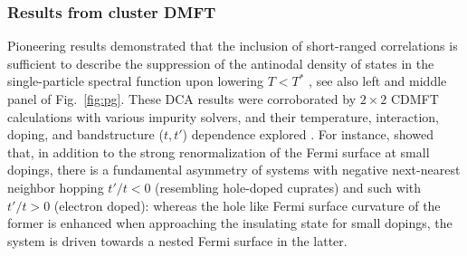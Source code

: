 \documentclass{ar-1col}
\begin{document}
\subsubsection{Results from cluster DMFT}
Pioneering results demonstrated that the inclusion of short-ranged correlations is sufficient to describe the suppression of the antinodal density of states in the single-particle spectral function upon lowering $T<T^*$ \cite{Maier00,Huscroft01,Macridin06}, see also left and middle panel of Fig.~\ref{fig:pg}. These DCA results were corroborated by $2\times 2$ CDMFT calculations with various impurity solvers, and their temperature, interaction, doping, and bandstructure ($t,t'$) dependence explored \cite{Parcollet04, Civelli05, Kyung06, Tremblay06, Zhang07, Liebsch09}. For instance, \cite{Civelli05} showed that, in addition to the strong renormalization of the Fermi surface at small dopings, there is a fundamental asymmetry of systems with negative next-nearest neighbor hopping $t'/t<0$ (resembling hole-doped cuprates) and such with $t'/t>0$ (electron doped): whereas the hole like Fermi surface curvature of the former is enhanced when approaching the insulating state for small dopings, the system is driven towards a nested Fermi surface in the latter. 
\end{document}
